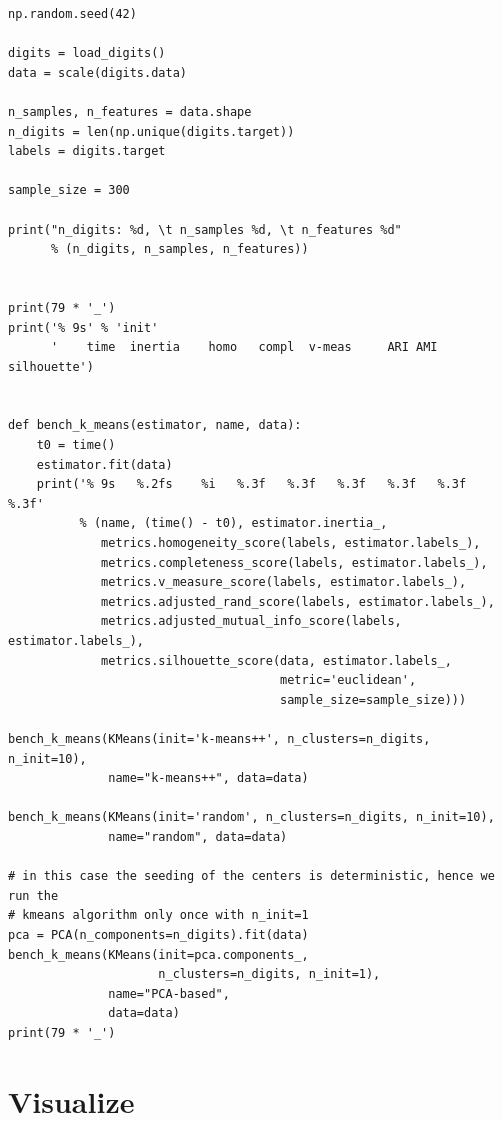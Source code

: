\begin{verbatim}
np.random.seed(42)

digits = load_digits()
data = scale(digits.data)

n_samples, n_features = data.shape
n_digits = len(np.unique(digits.target))
labels = digits.target

sample_size = 300

print("n_digits: %d, \t n_samples %d, \t n_features %d"
      % (n_digits, n_samples, n_features))


print(79 * '_')
print('% 9s' % 'init'
      '    time  inertia    homo   compl  v-meas     ARI AMI  silhouette')


def bench_k_means(estimator, name, data):
    t0 = time()
    estimator.fit(data)
    print('% 9s   %.2fs    %i   %.3f   %.3f   %.3f   %.3f   %.3f    %.3f'
          % (name, (time() - t0), estimator.inertia_,
             metrics.homogeneity_score(labels, estimator.labels_),
             metrics.completeness_score(labels, estimator.labels_),
             metrics.v_measure_score(labels, estimator.labels_),
             metrics.adjusted_rand_score(labels, estimator.labels_),
             metrics.adjusted_mutual_info_score(labels,  estimator.labels_),
             metrics.silhouette_score(data, estimator.labels_,
                                      metric='euclidean',
                                      sample_size=sample_size)))

bench_k_means(KMeans(init='k-means++', n_clusters=n_digits, n_init=10),
              name="k-means++", data=data)

bench_k_means(KMeans(init='random', n_clusters=n_digits, n_init=10),
              name="random", data=data)

# in this case the seeding of the centers is deterministic, hence we run the
# kmeans algorithm only once with n_init=1
pca = PCA(n_components=n_digits).fit(data)
bench_k_means(KMeans(init=pca.components_, 
                     n_clusters=n_digits, n_init=1),
              name="PCA-based",
              data=data)
print(79 * '_')
\end{verbatim}

\section{Visualize}\label{visualize}

